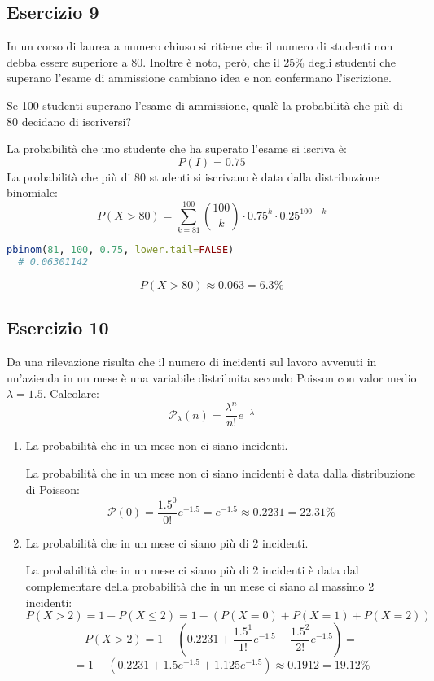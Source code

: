 \documentclass[a4paper]{article}
\theoremstyle{break}
\theoremstyle{break}
\theoremstyle{break}
\theoremstyle{break}
\begin{document}
\subsection{Esercizio 9}
In un corso di laurea a numero chiuso si ritiene che il numero di studenti non debba
essere superiore a 80. Inoltre è noto, però, che il 25\% degli studenti che superano
l'esame di ammissione cambiano idea e non confermano l'iscrizione.

\noindent Se 100 studenti superano l'esame di ammissione, qualè la probabilità che più di
80 decidano di iscriversi?

\vspace{1em}
\noindent La probabilità che uno studente che ha superato l'esame si iscriva è:
\[
	P(I) = 0.75
\]
La probabilità che più di 80 studenti si iscrivano è data dalla distribuzione binomiale:
\[
\]
\[
	P(X > 80) = \sum_{k=81}^{100} \binom{100}{k} \cdot 0.75^k \cdot 0.25^{100-k}
\]
\begin{lstlisting}[language=R]
  pbinom(81, 100, 0.75, lower.tail=FALSE)
  # 0.06301142
\end{lstlisting}
\[
	P(X > 80) \approx 0.063 = 6.3\%
\]

\subsection{Esercizio 10}
Da una rilevazione risulta che il numero di incidenti sul lavoro avvenuti in un'azienda
in un mese è una variabile distribuita secondo Poisson con valor medio \( \lambda = 1.5 \).
Calcolare:
\[
	\mathcal{P}_{\lambda}(n) = \frac{\lambda^n}{n!}e^{-\lambda}
\]
\begin{enumerate}
	\item La probabilità che in un mese non ci siano incidenti.

	      \vspace{1em}
	      La probabilità che in un mese non ci siano incidenti è data dalla distribuzione
	      di Poisson:
	      \[
		      \mathcal{P}(0) = \frac{1.5^0}{0!}e^{-1.5} = e^{-1.5} \approx 0.2231 = 22.31\%
	      \]
	\item La probabilità che in un mese ci siano più di 2 incidenti.

	      \vspace{1em}
	      La probabilità che in un mese ci siano più di 2 incidenti è data dal complementare
	      della probabilità che in un mese ci siano al massimo 2 incidenti:
	      \[
		      P(X > 2) = 1 - P(X \le 2) = 1 - \left( P(X = 0) + P(X = 1) + P(X = 2) \right)
	      \]
	      \[
		      P(X > 2) = 1 - \left( 0.2231 + \frac{1.5^1}{1!}e^{-1.5} +
		      \frac{1.5^2}{2!}e^{-1.5} \right) =
	      \]
	      \[
		      = 1 - \left( 0.2231 + 1.5e^{-1.5} + 1.125e^{-1.5} \right) \approx 0.1912 = 19.12\%
	      \]
\end{enumerate}
\end{document}

